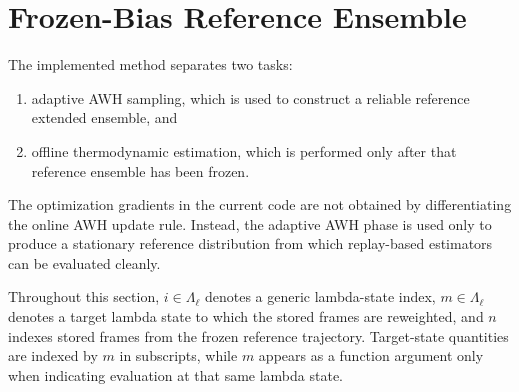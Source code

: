 \section{Frozen-Bias Reference Ensemble}

The implemented method separates two tasks:

\begin{enumerate}
    \item adaptive AWH sampling, which is used to construct a reliable reference extended ensemble, and
    \item offline thermodynamic estimation, which is performed only after that reference ensemble has been frozen.
\end{enumerate}
%
The optimization gradients in the current code are not obtained by differentiating the online AWH update rule. Instead, the adaptive AWH phase is used only to produce a stationary reference distribution from which replay-based estimators can be evaluated cleanly.

Throughout this section, $i \in \Lambda_\ell$ denotes a generic lambda-state index, $m \in \Lambda_\ell$ denotes a target lambda state to which the stored frames are reweighted, and $n$ indexes stored frames from the frozen reference trajectory. Target-state quantities are indexed by $m$ in subscripts, while $m$ appears as a function argument only when indicating evaluation at that same lambda state.

